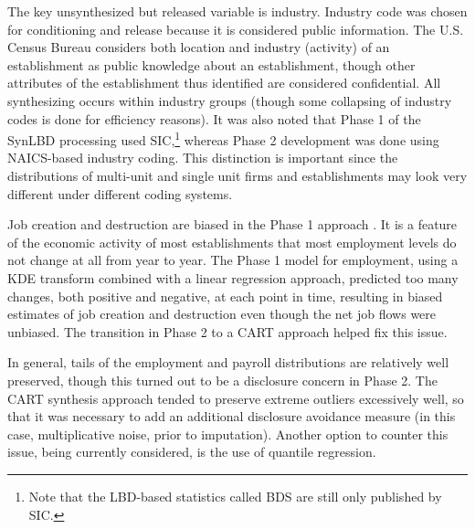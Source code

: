 \documentclass[letterpaper,12pt]{article}
\begin{document}
The key unsynthesized but released variable is industry. Industry code was chosen for conditioning and release because it is considered public information. The U.S. Census Bureau considers both location and industry (activity) of an establishment as public knowledge about an establishment, though other attributes of the establishment thus identified are considered confidential. All synthesizing occurs within industry groups (though some collapsing of industry codes is done for efficiency reasons). It was also noted that Phase 1 of the SynLBD processing used \ac{SIC},\footnote{Note that the LBD-based statistics called \ac{BDS} are still only published by \ac{SIC}.} whereas Phase 2 development was done using \ac{NAICS}-based industry coding. This distinction is important since the distributions of multi-unit and single unit firms and establishments may look very different under different coding systems.  



Job creation and destruction are biased in the Phase 1 approach \citep{KinneyEtAl2011,RePEc:cen:wpaper:14-13}. It is a feature of the economic activity of most establishments that most employment levels do not change at all  from year to year. The Phase 1 model for employment, using a \ac{KDE} transform combined with a linear regression approach, predicted too many changes, both positive and negative, at each point in time, resulting in biased estimates of job creation and destruction even though the net job flows were unbiased. The transition in Phase 2 to a \ac{CART} approach  helped fix this issue.

In general, tails of the employment and payroll distributions are relatively well preserved, though this turned out to be a disclosure concern in Phase 2. The CART synthesis approach tended to preserve extreme outliers excessively well, so that it was necessary to add an additional disclosure avoidance measure (in this case, multiplicative noise, prior to imputation). Another option to counter this issue, being currently considered, is the use of  quantile regression.
\end{document}
